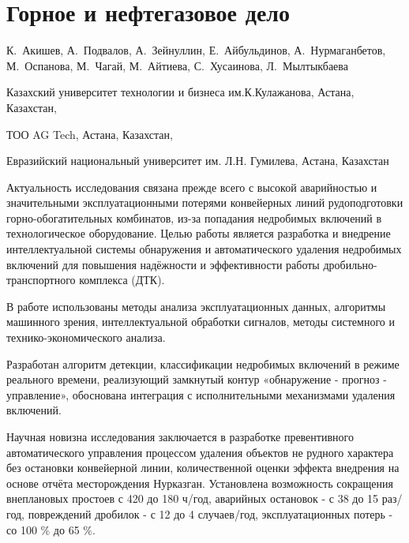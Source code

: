 \let\cleardoublepage\clearpage
\chapter{Горное и нефтегазовое дело}

\begin{header}

К.~Акишев\envelope,
А.~Подвалов,
А.~Зейнуллин\envelope,
Е.~Айбульдинов\envelope,
А.~Нурмаганбетов,
М.~Оспанова,
М.~Чагай,
М.~Айтиева,
С.~Хусаинова,
Л.~Мылтыкбаева
\end{header}

\begin{affil}
Казахский университет технологии и бизнеса им.К.Кулажанова, Астана, Казахстан,

ТОО AG Tech, Астана, Казахстан,

Евразийский национальный университет им. Л.Н. Гумилева, Астана, Казахстан

\end{affil}

Актуальность исследования связана прежде всего с высокой аварийностью и
значительными эксплуатационными потерями конвейерных линий
рудоподготовки горно-обогатительных комбинатов, из-за попадания
недробимых включений в технологическое оборудование. Целью работы
является разработка и внедрение интеллектуальной системы обнаружения и
автоматического удаления недробимых включений для повышения надёжности и
эффективности работы дробильно-транспортного комплекса (ДТК).

В работе использованы методы анализа эксплуатационных данных, алгоритмы
машинного зрения, интеллектуальной обработки сигналов, методы системного
и технико-экономического анализа.

Разработан алгоритм детекции, классификации недробимых включений в
режиме реального времени, реализующий замкнутый контур «обнаружение -
прогноз - управление», обоснована интеграция с исполнительными
механизмами удаления включений.

Научная новизна исследования заключается в разработке превентивного
автоматического управления процессом удаления объектов не рудного
характера без остановки конвейерной линии, количественной оценки эффекта
внедрения на основе отчёта месторождения Нурказган. Установлена
возможность сокращения внеплановых простоев с 420 до 180 ч/год,
аварийных остановок - с 38 до 15 раз/год, повреждений дробилок - с 12 до
4 случаев/год, эксплуатационных потерь - со 100 \% до 65 \%.

